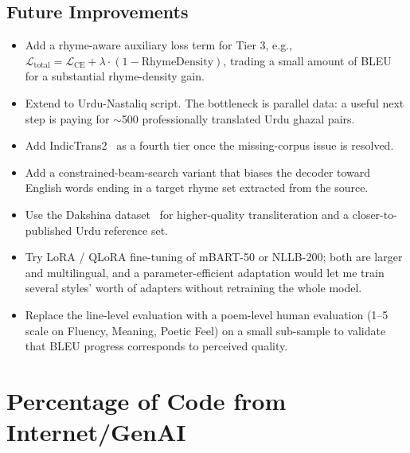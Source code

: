 \documentclass[11pt]{article}
\begin{document}
\subsection{Future Improvements}
\begin{itemize}[leftmargin=*,topsep=0pt]
  \item Add a rhyme-aware auxiliary loss term for Tier 3, e.g., $\mathcal{L}_{\text{total}} = \mathcal{L}_{\text{CE}} + \lambda \cdot (1 - \mathrm{RhymeDensity})$, trading a small amount of BLEU for a substantial rhyme-density gain.
  \item Extend to Urdu-Nastaliq script. The bottleneck is parallel data: a useful next step is paying for $\sim$500 professionally translated Urdu ghazal pairs.
  \item Add IndicTrans2~\cite{indictrans2_repo,indictrans2_hf} as a fourth tier once the missing-corpus issue is resolved.
  \item Add a constrained-beam-search variant that biases the decoder toward English words ending in a target rhyme set extracted from the source.
  \item Use the Dakshina dataset~\cite{dakshina} for higher-quality transliteration and a closer-to-published Urdu reference set.
  \item Try LoRA / QLoRA fine-tuning of mBART-50 or NLLB-200; both are larger and multilingual, and a parameter-efficient adaptation would let me train several styles' worth of adapters without retraining the whole model.
  \item Replace the line-level evaluation with a poem-level human evaluation (1--5 scale on Fluency, Meaning, Poetic Feel) on a small sub-sample to validate that BLEU progress corresponds to perceived quality.
\end{itemize}

\newpage
\section{Percentage of Code from Internet/GenAI}
\end{document}
